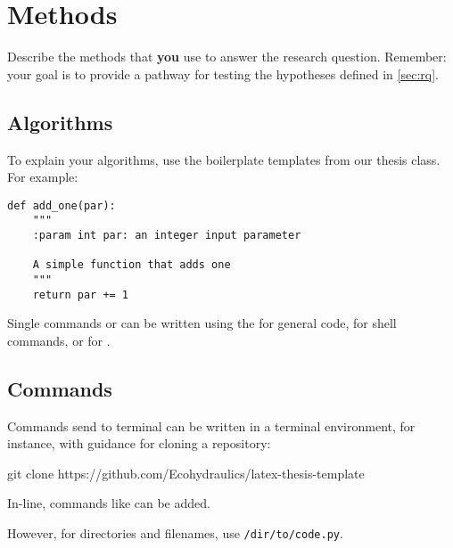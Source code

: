 \chapter{Methods} %
\label{ch:methods}

Describe the methods that \textbf{you} use to answer the research question. Remember: your goal is to provide a pathway for testing the hypotheses defined in \autoref{sec:rq}.

\section{Algorithms}

To explain your algorithms, use the boilerplate templates from our thesis class. For example:

\begin{lstlisting}
def add_one(par):
	"""
	:param int par: an integer input parameter
	
	A simple function that adds one
	"""
	return par += 1
\end{lstlisting}

Single commands or  can be written using the \inlinecode{\inlinecode} for general code,  for shell commands, or \inlinecode{\inlinepy} for .

\section{Commands}

Commands send to terminal can be written in a terminal environment, for instance, with guidance for cloning a repository:

\begin{terminal}
	 git clone https://github.com/Ecohydraulics/latex-thesis-template
\end{terminal}

In-line, commands like  can be added.

However, for directories and filenames, use \texttt{/dir/to/code.py}.

